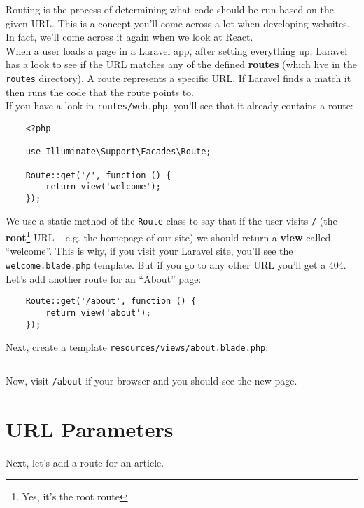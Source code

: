 Routing is the process of determining what code should be run based on the given URL. This is a concept you'll come across a lot when developing websites. In fact, we'll come across it again when we look at React.
\\

When a user loads a page in a Laravel app, after setting everything up, Laravel has a look to see if the URL matches any of the defined \textbf{routes} (which live in the \texttt{routes} directory). A route represents a specific URL. If Laravel finds a match it then runs the code that the route points to.
\\

If you have a look in \texttt{routes/web.php}, you'll see that it already contains a route:

\begin{verbatim}
    <?php

    use Illuminate\Support\Facades\Route;

    Route::get('/', function () {
        return view('welcome');
    });
\end{verbatim}

We use a static method of the \texttt{Route} class to say that if the user visits \texttt{/} (the \textbf{root}\footnote{Yes, it's the root route} URL – e.g. the homepage of our site) we should return a \textbf{view} called ``welcome''. This is why, if you visit your Laravel site, you'll see the \texttt{welcome.blade.php} template. But if you go to any other URL you'll get a 404.
\\

Let's add another route for an ``About'' page:

\begin{verbatim}
    Route::get('/about', function () {
        return view('about');
    });
\end{verbatim}

Next, create a template \texttt{resources/views/about.blade.php}:

\inputminted{html}{07-routing/figures/01-about.blade.php}

Now, visit \texttt{/about} if your browser and you should see the new page.



\section{URL Parameters}

Next, let's add a route for an article.
\\

